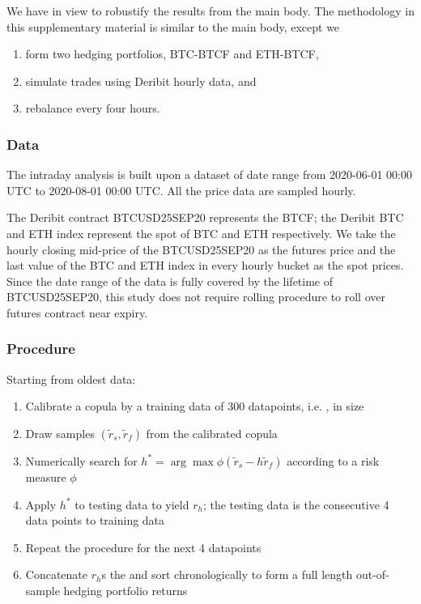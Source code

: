 \documentclass[11pt,a4paper,english]{article}
\begin{document}
We have in view to robustify the results from the main body.
The methodology in this supplementary material is similar to the main body, except we
\begin{enumerate}
\item form two hedging portfolios, BTC-BTCF and ETH-BTCF,
\item simulate trades using Deribit hourly data, and
\item rebalance every four hours.
\end{enumerate}

\subsubsection{Data}
The intraday analysis is built upon a dataset of date range from 2020-06-01 00:00 UTC to 2020-08-01 00:00 UTC.
All the price data are sampled hourly.

The Deribit contract BTCUSD25SEP20 represents the BTCF;
the Deribit BTC and ETH index represent the spot of BTC and ETH respectively.
We take the hourly closing mid-price of the BTCUSD25SEP20 as the futures price and the last value of the BTC and ETH index in every hourly bucket as the spot prices.
Since the date range of the data is fully covered by the lifetime of BTCUSD25SEP20, this study does not require rolling procedure to roll over futures contract near expiry.

\subsubsection{Procedure}
Starting from oldest data:
\begin{enumerate}
    \item Calibrate a copula by a training data of 300 datapoints, i.e. , in size
    \item Draw samples $(\tilde r_s, \tilde r_f)$ from the calibrated copula
    \item Numerically search for $h^* = \arg \max \phi(\tilde r_s - h\tilde r_f)$ according to a risk measure $\phi$
    \item Apply $h^*$ to testing data to yield $r_h$; the testing data is the consecutive 4 data points to training data
    \item Repeat the procedure for the next 4 datapoints
    \item Concatenate $r_h$s the and sort chronologically to form a full length out-of-sample hedging portfolio returns
\end{enumerate}
\end{document}

